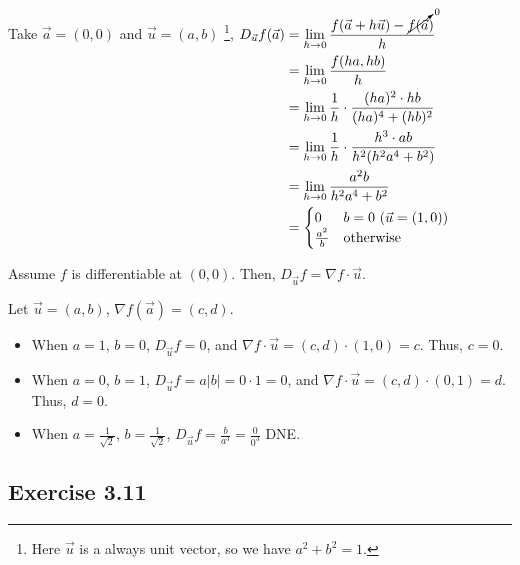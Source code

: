 \documentclass[11pt,fleqn]{book} %
\begin{document}
Take $\vec{a} = (0,0)$ and $\vec{u} = (a,b)$ \footnote{Here $\vec{u}$ is a always unit vector, so we have $a^2 + b^2 = 1$. },
$\begin{aligned}[t]
    D_{\vec{u}} f(\vec{a}) & = \lim_{h\to0} \frac{f(\vec{a} + h\vec{u}) - \cancelto{0}{f(\vec{a}})}{h} \\
                           & = \lim_{h\to0} \frac{f(ha, hb)}{h}                                        \\
                           & = \lim_{h\to0} \frac{1}{h} \cdot \frac{(ha)^2 \cdot hb}{(ha)^4 + (hb)^2}  \\
                           & = \lim_{h\to0} \frac{1}{h} \cdot \frac{h^3 \cdot ab}{h^2(h^2a^4 + b^2)}   \\
                           & = \lim_{h\to0} \frac{a^2b}{h^2a^4 + b^2}                                  \\
                           & = \begin{cases}
                                   0             & b = 0 ~ (\vec{u} = (1,0)) \\
                                   \frac{a^2}{b} & \text{otherwise}
                               \end{cases}
\end{aligned}$

Assume $f$ is differentiable at $(0,0)$. Then, $D_{\vec{u}}f = \nabla f \cdot \vec{u}$. 

Let $\vec{u} = (a,b)$, $\nabla f(\vec{a}) = (c,d)$. 
\begin{itemize}
    \item When $a = 1$, $b = 0$,  $D_{\vec{u}} f = 0$, and $\nabla f \cdot \vec{u} = (c, d) \cdot (1, 0) = c$. Thus, $c = 0$. 
    \item When $a = 0$, $b = 1$,  $D_{\vec{u}} f = a|b| = 0 \cdot 1 = 0$, and $\nabla f \cdot \vec{u} = (c, d) \cdot (0, 1) = d$. Thus, $d = 0$. 
    \item When $a = \frac{1}{\sqrt{2}}$, $b = \frac{1}{\sqrt{2}}$, $D_{\vec{u}} f = \frac{b}{a^3} = \frac{0}{0^3}$ DNE. %
\end{itemize}

\subsection*{Exercise 3.11}
\end{document}
